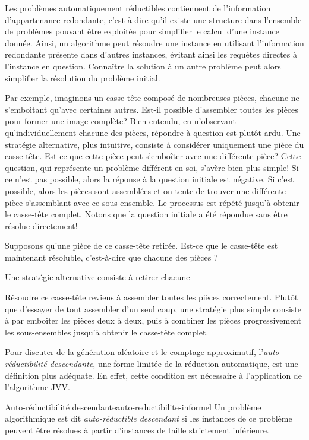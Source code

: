 Les problèmes automatiquement réductibles contiennent de l'information d'appartenance redondante, c'est-à-dire qu'il existe une structure dans l'ensemble de problèmes pouvant être exploitée pour simplifier le calcul d'une instance donnée. Ainsi, un algorithme peut résoudre une instance en utilisant l'information redondante présente dans d'autres instances, évitant ainsi les requêtes directes à l'instance en question. Connaître la solution à un autre problème peut alors simplifier la résolution du problème initial. 

Par exemple, imaginons un casse-tête composé de nombreuses pièces, chacune ne s'emboitant qu'avec certaines autres. Est-il possible d'assembler toutes les pièces pour former une image complète? Bien entendu, en n'observant qu'individuellement chacune des pièces, répondre à question est plutôt ardu. Une stratégie alternative, plus intuitive, consiste à considérer uniquement une pièce du casse-tête. Est-ce que cette pièce peut s'emboîter avec une différente pièce? Cette question, qui représente un problème différent en soi, s'avère bien plus simple! Si ce n'est pas possible, alors la réponse à la question initiale est négative. Si c'est possible, alors les pièces sont assemblées et on tente de trouver une différente pièce s'assemblant avec ce sous-ensemble. Le processus est répété jusqu'à obtenir le casse-tête complet. Notons que la question initiale a été répondue sans être résolue directement!


Supposons qu'une pièce de ce casse-tête retirée. Est-ce que le casse-tête est maintenant résoluble, c'est-à-dire que chacune des pièces ?


Une stratégie alternative consiste à retirer chacune   


Résoudre ce casse-tête reviens à assembler toutes les pièces correctement. Plutôt que d'essayer de tout assembler d'un seul coup, une stratégie plus simple consiste à par emboîter les pièces deux à deux, puis à combiner les pièces progressivement les sous-ensembles jusqu'à obtenir le casse-tête complet.

Pour discuter de la génération aléatoire et le comptage approximatif, l'\textit{auto-réductibilité descendante}, une forme limitée de la réduction automatique, est une définition plus adéquate. En effet, cette condition est nécessaire à l'application de l'algorithme JVV.

\begin{maindefinition}{Auto-réductibilité descendante}{auto-reductibilite-informel}
    Un problème algorithmique est dit \textit{auto-réductible descendant} si les instances de ce problème peuvent être résolues à partir d'instances de taille strictement inférieure.
\end{maindefinition}

